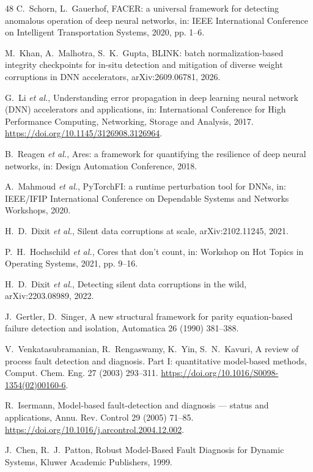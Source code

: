 \documentclass{ieeeaccess}
\begin{document}
\begin{thebibliography}{48}
 C.~Schorn, L.~Gauerhof, FACER: a universal framework for detecting anomalous operation of deep neural networks, in: IEEE International Conference on Intelligent Transportation Systems, 2020, pp. 1--6.

 M.~Khan, A.~Malhotra, S.~K.~Gupta, BLINK: batch normalization-based integrity checkpoints for in-situ detection and mitigation of diverse weight corruptions in DNN accelerators, arXiv:2609.06781, 2026.

 G.~Li \textit{et al.}, Understanding error propagation in deep learning neural network (DNN) accelerators and applications, in: International Conference for High Performance Computing, Networking, Storage and Analysis, 2017. \url{https://doi.org/10.1145/3126908.3126964}.

 B.~Reagen \textit{et al.}, Ares: a framework for quantifying the resilience of deep neural networks, in: Design Automation Conference, 2018.

 A.~Mahmoud \textit{et al.}, PyTorchFI: a runtime perturbation tool for DNNs, in: IEEE/IFIP International Conference on Dependable Systems and Networks Workshops, 2020.

 H.~D.~Dixit \textit{et al.}, Silent data corruptions at scale, arXiv:2102.11245, 2021.

 P.~H.~Hochschild \textit{et al.}, Cores that don't count, in: Workshop on Hot Topics in Operating Systems, 2021, pp. 9--16.

 H.~D.~Dixit \textit{et al.}, Detecting silent data corruptions in the wild, arXiv:2203.08989, 2022.

 J.~Gertler, D.~Singer, A new structural framework for parity equation-based failure detection and isolation, Automatica 26 (1990) 381--388.

 V.~Venkatasubramanian, R.~Rengaswamy, K.~Yin, S.~N.~Kavuri, A review of process fault detection and diagnosis. Part I: quantitative model-based methods, Comput. Chem. Eng. 27 (2003) 293--311. \url{https://doi.org/10.1016/S0098-1354(02)00160-6}.

 R.~Isermann, Model-based fault-detection and diagnosis --- status and applications, Annu. Rev. Control 29 (2005) 71--85. \url{https://doi.org/10.1016/j.arcontrol.2004.12.002}.

 J.~Chen, R.~J.~Patton, Robust Model-Based Fault Diagnosis for Dynamic Systems, Kluwer Academic Publishers, 1999.


\end{thebibliography}
\end{document}

